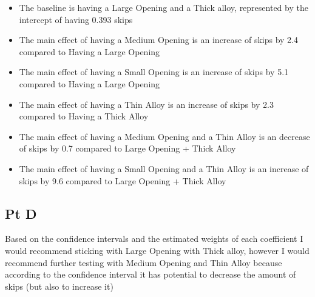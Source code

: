 \documentclass[
]{article}
\begin{document}
\begin{itemize}
\item
  The baseline is having a Large Opening and a Thick alloy, represented
  by the intercept of having 0.393 skips
\item
  The main effect of having a Medium Opening is an increase of skips by
  2.4 compared to Having a Large Opening
\item
  The main effect of having a Small Opening is an increase of skips by
  5.1 compared to Having a Large Opening
\item
  The main effect of having a Thin Alloy is an increase of skips by 2.3
  compared to Having a Thick Alloy
\item
  The main effect of having a Medium Opening and a Thin Alloy is an
  decrease of skips by 0.7 compared to Large Opening + Thick Alloy
\item
  The main effect of having a Small Opening and a Thin Alloy is an
  increase of skips by 9.6 compared to Large Opening + Thick Alloy
\end{itemize}

\hypertarget{pt-d}{%
\subsection{Pt D}\label{pt-d}}

Based on the confidence intervals and the estimated weights of each
coefficient I would recommend sticking with Large Opening with Thick
alloy, however I would recommend further testing with Medium Opening and
Thin Alloy because according to the confidence interval it has potential
to decrease the amount of skips (but also to increase it)
\end{document}
